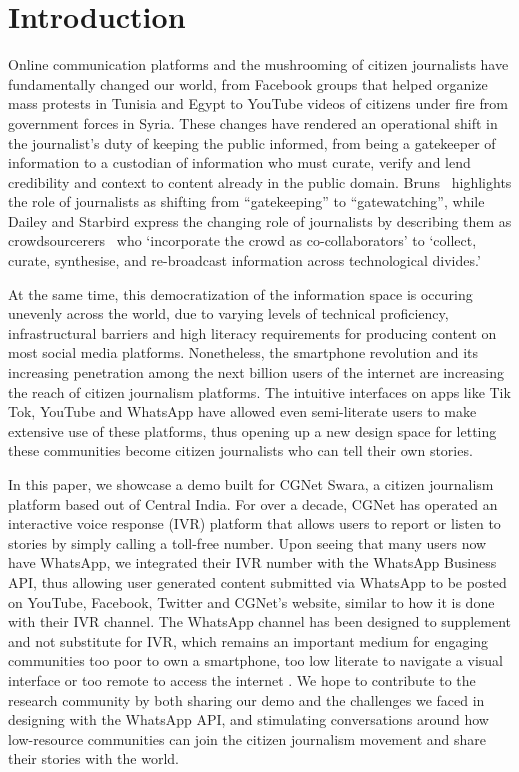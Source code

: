 \section{Introduction}

Online communication platforms and the mushrooming of citizen journalists have fundamentally changed our world, from Facebook groups that helped organize mass protests in Tunisia and Egypt to YouTube videos of citizens under fire from government forces in Syria. These changes have rendered an operational shift in the journalist's duty of keeping the public informed, from being a gatekeeper of information to a custodian of information who must curate, verify and lend credibility and context to content already in the public domain. Bruns~\cite{bruns_2008_active} highlights the role of journalists as shifting from “gatekeeping” to “gatewatching”, while Dailey and Starbird express the changing role of journalists by describing them as crowdsourcerers~\cite{starbird_2014_journalists} who ‘incorporate the crowd as co-collaborators’ to ‘collect, curate, synthesise, and re-broadcast information across technological divides.’

At the same time, this democratization of the information space is occuring unevenly across the world, due to varying levels of technical proficiency, infrastructural barriers and high literacy requirements for producing content on most social media platforms. Nonetheless, the smartphone revolution and its increasing penetration among the next billion users of the internet are increasing the reach of citizen journalism platforms. The intuitive interfaces on apps like Tik Tok, YouTube and WhatsApp have allowed even semi-literate users to make extensive use of these platforms, thus opening up a new design space for letting these communities become citizen journalists who can tell their own stories.

In this paper, we showcase a demo built for CGNet Swara, a citizen journalism platform based out of Central India. For over a decade, CGNet has operated an interactive voice response (IVR) platform that allows users to report or listen to stories by simply calling a toll-free number. Upon seeing that many users now have WhatsApp, we integrated their IVR number with the WhatsApp Business API, thus allowing user generated content submitted via WhatsApp to be posted on YouTube, Facebook, Twitter and CGNet's website, similar to how it is done with their IVR channel. The WhatsApp channel has been designed to supplement and not substitute for IVR, which remains an important medium for engaging communities too poor to own a smartphone, too low literate to navigate a visual interface or too remote to access the internet \cite{vashistha2019social}. We hope to contribute to the research community by both sharing our demo and the challenges we faced in designing with the WhatsApp API, and stimulating conversations around how low-resource communities can join the citizen journalism movement and share their stories with the world.


